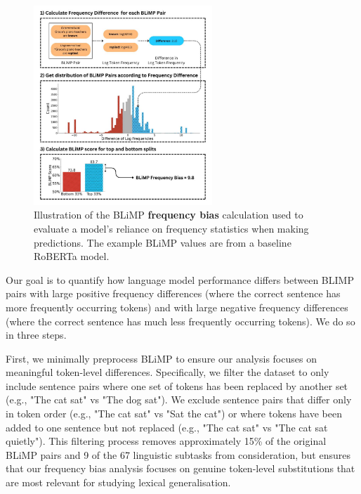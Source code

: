 \begin{figure}
    \centering
    \includegraphics[width=0.6\textwidth]{chapters/syntatic-smoothing/figures/blimp_bias_example.pdf}
    \caption{Illustration of the BLiMP \textbf{frequency bias} calculation used to evaluate a model's reliance on frequency statistics when making predictions. The example BLiMP values are from a baseline RoBERTa model.}
    \label{fig:blimp_bias}
    \vspace{-1em}
\end{figure}

Our goal is to quantify how language model performance differs between BLIMP pairs with large positive frequency differences (where the correct sentence has more frequently occurring tokens) and with large negative frequency differences (where the correct sentence has much less frequently occurring tokens). We do so in three steps.

First, we minimally preprocess BLiMP to ensure our analysis focuses on meaningful token-level differences. Specifically, we filter the dataset to only include sentence pairs where one set of tokens has been replaced by another set (e.g., "The cat sat" vs "The dog sat"). We exclude sentence pairs that differ only in token order (e.g., "The cat sat" vs "Sat the cat") or where tokens have been added to one sentence but not replaced (e.g., "The cat sat" vs "The cat sat quietly"). This filtering process removes approximately 15\% of the original BLiMP pairs and 9 of the 67 linguistic subtasks from consideration, but ensures that our frequency bias analysis focuses on genuine token-level substitutions that are most relevant for studying lexical generalisation.

